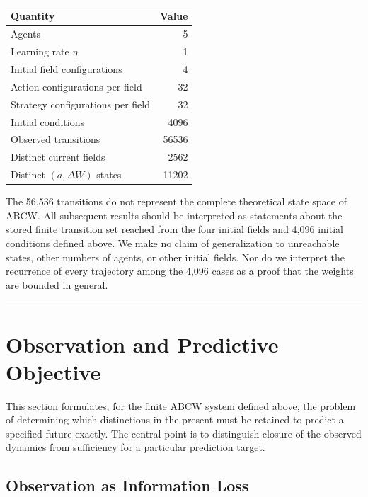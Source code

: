 \documentclass[
  11pt,
]{article}
\begin{document}
\begin{longtable}[]{@{}lr@{}}
\toprule\noalign{}
Quantity & Value \\
\midrule\noalign{}
\endhead
\bottomrule\noalign{}
\endlastfoot
Agents & 5 \\
Learning rate \(\eta\) & 1 \\
Initial field configurations & 4 \\
Action configurations per field & 32 \\
Strategy configurations per field & 32 \\
Initial conditions & 4096 \\
Observed transitions & 56536 \\
Distinct current fields & 2562 \\
Distinct \((a,\Delta W)\) states & 11202 \\
\end{longtable}

The 56,536 transitions do not represent the complete theoretical state
space of ABCW. All subsequent results should be interpreted as
statements about the stored finite transition set reached from the four
initial fields and 4,096 initial conditions defined above. We make no
claim of generalization to unreachable states, other numbers of agents,
or other initial fields. Nor do we interpret the recurrence of every
trajectory among the 4,096 cases as a proof that the weights are bounded
in general.

\begin{center}\rule{0.5\linewidth}{0.5pt}\end{center}

\hypertarget{observation-and-predictive-objective}{%
\section{Observation and Predictive
Objective}\label{observation-and-predictive-objective}}

This section formulates, for the finite ABCW system defined above, the
problem of determining which distinctions in the present must be
retained to predict a specified future exactly. The central point is to
distinguish closure of the observed dynamics from sufficiency for a
particular prediction target.

\hypertarget{observation-as-information-loss}{%
\subsection{Observation as Information
Loss}\label{observation-as-information-loss}}
\end{document}
